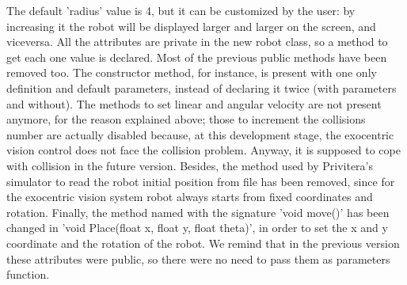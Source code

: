 The default 'radius' value is 4, but it can be customized by the user: by increasing it the robot will be 
displayed larger and larger on the screen, and viceversa.
\newline All the attributes are private in the new robot class, so a method to get each one value is declared.
\newline Most of the previous public methods have been removed too. The constructor method, for instance, is present with one
only definition and default parameters, instead of declaring it twice (with parameters and without). The methods to set
linear and angular velocity are not present anymore, for the reason explained above; those to increment the collisions number are
actually disabled because, at this development stage, the exocentric vision control does not face the collision problem.
Anyway, it is supposed to cope with collision in the future version.
\newline Besides, the method used by Privitera's simulator to read the robot initial position from file has been removed, since for
the exocentric vision system robot always starts from fixed coordinates and rotation.
\newline Finally, the method named with the signature 'void move()' has been changed in 'void Place(float x, float y, float theta)',
in order to set the x and y coordinate and the rotation of the robot. We remind that in the previous version these attributes
were public, so there were no need to pass them as parameters function.
